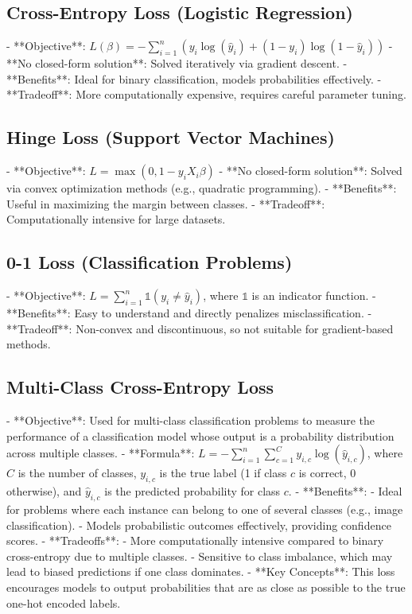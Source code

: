 \documentclass[10pt]{article}
\begin{document}
\begin{multicols}{2}
\subsection*{Cross-Entropy Loss (Logistic Regression)}
- **Objective**: $L(\beta) = - \sum_{i=1}^{n} \left(y_i \log(\hat{y}_i) + (1 - y_i) \log(1 - \hat{y}_i)\right)$
- **No closed-form solution**: Solved iteratively via gradient descent.
- **Benefits**: Ideal for binary classification, models probabilities effectively.
- **Tradeoff**: More computationally expensive, requires careful parameter tuning.

\subsection*{Hinge Loss (Support Vector Machines)}
- **Objective**: $L = \max(0, 1 - y_i X_i \beta)$
- **No closed-form solution**: Solved via convex optimization methods (e.g., quadratic programming).
- **Benefits**: Useful in maximizing the margin between classes.
- **Tradeoff**: Computationally intensive for large datasets.

\subsection*{0-1 Loss (Classification Problems)}
- **Objective**: $L = \sum_{i=1}^{n} \mathbb{1}(y_i \neq \hat{y}_i)$, where $\mathbb{1}$ is an indicator function.
- **Benefits**: Easy to understand and directly penalizes misclassification.
- **Tradeoff**: Non-convex and discontinuous, so not suitable for gradient-based methods.

\subsection*{Multi-Class Cross-Entropy Loss}
- **Objective**: Used for multi-class classification problems to measure the performance of a classification model whose output is a probability distribution across multiple classes.
- **Formula**: $L = -\sum_{i=1}^{n} \sum_{c=1}^{C} y_{i,c} \log(\hat{y}_{i,c})$, where $C$ is the number of classes, $y_{i,c}$ is the true label (1 if class $c$ is correct, 0 otherwise), and $\hat{y}_{i,c}$ is the predicted probability for class $c$.
- **Benefits**: 
  - Ideal for problems where each instance can belong to one of several classes (e.g., image classification).
  - Models probabilistic outcomes effectively, providing confidence scores.
- **Tradeoffs**: 
  - More computationally intensive compared to binary cross-entropy due to multiple classes.
  - Sensitive to class imbalance, which may lead to biased predictions if one class dominates.
- **Key Concepts**: This loss encourages models to output probabilities that are as close as possible to the true one-hot encoded labels.


\end{multicols}
\end{document}

